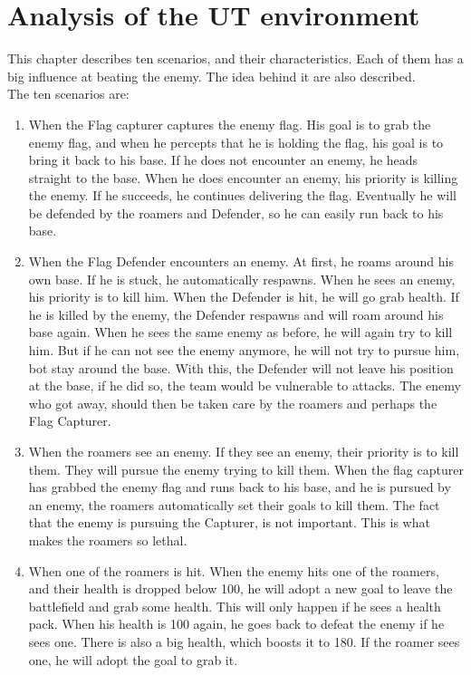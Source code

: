 \chapter{Analysis of the UT environment}
This chapter describes ten scenarios, and their characteristics. Each of them has a big influence at beating the enemy. The idea behind it are also described.\\
The ten scenarios are:
\begin{enumerate}
	\item When the Flag capturer captures the enemy flag. His goal is to grab the enemy flag, and when he percepts that he is holding the flag, his goal is to bring it back to his base. If he does not encounter an enemy, he heads straight to the base. When he does encounter an enemy, his priority is killing the enemy. If he succeeds, he continues delivering the flag. Eventually he will be defended by the roamers and Defender, so he can easily run back to his base.\\
	\item When the Flag Defender encounters an enemy. At first, he roams around his own base. If he is stuck, he automatically respawns. When he sees an enemy, his priority is to kill him. When the Defender is hit, he will go grab health. If he is killed by the enemy, the Defender respawns and will roam around his base again. When he sees the same enemy as before, he will again try to kill him. But if he can not see the enemy anymore, he will not try to pursue him, bot stay around the base. With this, the Defender will not leave his position at the base, if he did so, the team would be vulnerable to attacks. The enemy who got away, should then be taken care by the roamers and perhaps the Flag Capturer.\\
	\item When the roamers see an enemy. If they see an enemy, their priority is to kill them. They will pursue the enemy trying to kill them. When the flag capturer has grabbed the enemy flag and runs back to his base, and he is pursued by an enemy, the roamers automatically set their goals to kill them. The fact that the enemy is pursuing the Capturer, is not important. This is what makes the roamers so lethal. \\
	\item When one of the roamers is hit. When the enemy hits one of the roamers, and their health is dropped below 100, he will adopt a new goal to leave the battlefield and grab some health. This will only happen if he sees a health pack. When his health is 100 again, he goes back to defeat the enemy if he sees one. There is also a big health, which boosts it to 180. If the roamer sees one, he will adopt the goal to grab it.\\

\end{enumerate}
